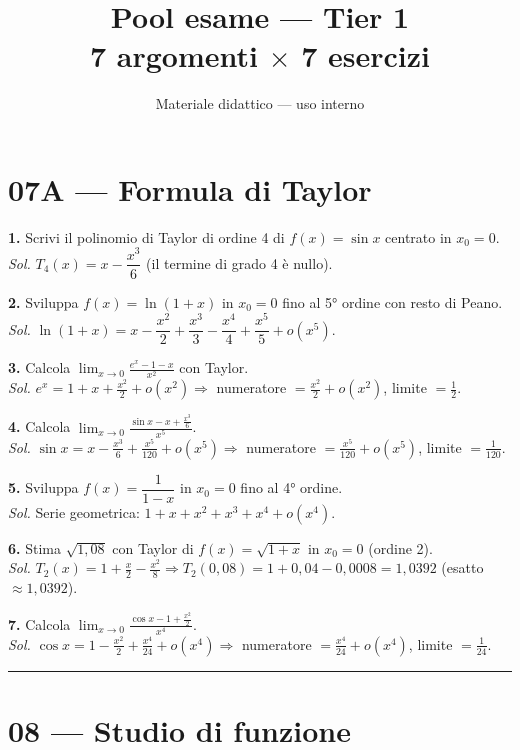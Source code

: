 \documentclass[11pt,a4paper]{article}
\title{\textbf{Pool esame — Tier 1}\\\large 7 argomenti $\times$ 7 esercizi}
\author{Materiale didattico — uso interno}
\date{}
\begin{document}
\maketitle

\section*{07A — Formula di Taylor}

\textbf{1.} Scrivi il polinomio di Taylor di ordine 4 di $f(x)=\sin x$ centrato in $x_0=0$.\\
\emph{Sol.} $T_4(x)=x-\dfrac{x^3}{6}$ (il termine di grado 4 è nullo).

\textbf{2.} Sviluppa $f(x)=\ln(1+x)$ in $x_0=0$ fino al 5° ordine con resto di Peano.\\
\emph{Sol.} $\ln(1+x)=x-\dfrac{x^2}{2}+\dfrac{x^3}{3}-\dfrac{x^4}{4}+\dfrac{x^5}{5}+o(x^5)$.

\textbf{3.} Calcola $\displaystyle\lim_{x\to 0}\frac{e^x-1-x}{x^2}$ con Taylor.\\
\emph{Sol.} $e^x=1+x+\tfrac{x^2}{2}+o(x^2)\Rightarrow$ numeratore $=\tfrac{x^2}{2}+o(x^2)$, limite $=\tfrac{1}{2}$.

\textbf{4.} Calcola $\displaystyle\lim_{x\to 0}\frac{\sin x - x + \frac{x^3}{6}}{x^5}$.\\
\emph{Sol.} $\sin x = x-\tfrac{x^3}{6}+\tfrac{x^5}{120}+o(x^5)\Rightarrow$ numeratore $=\tfrac{x^5}{120}+o(x^5)$, limite $=\tfrac{1}{120}$.

\textbf{5.} Sviluppa $f(x)=\dfrac{1}{1-x}$ in $x_0=0$ fino al 4° ordine.\\
\emph{Sol.} Serie geometrica: $1+x+x^2+x^3+x^4+o(x^4)$.

\textbf{6.} Stima $\sqrt{1{,}08}$ con Taylor di $f(x)=\sqrt{1+x}$ in $x_0=0$ (ordine 2).\\
\emph{Sol.} $T_2(x)=1+\tfrac{x}{2}-\tfrac{x^2}{8}\Rightarrow T_2(0{,}08)=1+0{,}04-0{,}0008=1{,}0392$ (esatto $\approx 1{,}0392$).

\textbf{7.} Calcola $\displaystyle\lim_{x\to 0}\frac{\cos x - 1 + \frac{x^2}{2}}{x^4}$.\\
\emph{Sol.} $\cos x = 1-\tfrac{x^2}{2}+\tfrac{x^4}{24}+o(x^4)\Rightarrow$ numeratore $=\tfrac{x^4}{24}+o(x^4)$, limite $=\tfrac{1}{24}$.

\medskip\hrule\medskip

\section*{08 — Studio di funzione}
\end{document}
